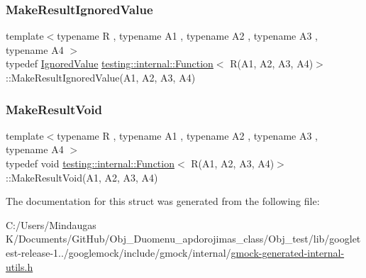 \mbox{\label{structtesting_1_1internal_1_1_function_3_01_r_07_a1_00_01_a2_00_01_a3_00_01_a4_08_4_a6736086d1c8ba25788add1e5180207f9}} 
\subsubsection{\texorpdfstring{MakeResultIgnoredValue}{MakeResultIgnoredValue}}
{\footnotesize\ttfamily template$<$typename R , typename A1 , typename A2 , typename A3 , typename A4 $>$ \\
typedef \mbox{\hyperlink{classtesting_1_1internal_1_1_ignored_value}{Ignored\+Value}} \mbox{\hyperlink{structtesting_1_1internal_1_1_function}{testing\+::internal\+::\+Function}}$<$ R(A1, A2, A3, A4)$>$\+::Make\+Result\+Ignored\+Value(A1, A2, A3, A4)}

\mbox{\label{structtesting_1_1internal_1_1_function_3_01_r_07_a1_00_01_a2_00_01_a3_00_01_a4_08_4_af7462da27e87a9d580e7f9748ebc5754}} 
\subsubsection{\texorpdfstring{MakeResultVoid}{MakeResultVoid}}
{\footnotesize\ttfamily template$<$typename R , typename A1 , typename A2 , typename A3 , typename A4 $>$ \\
typedef void \mbox{\hyperlink{structtesting_1_1internal_1_1_function}{testing\+::internal\+::\+Function}}$<$ R(A1, A2, A3, A4)$>$\+::Make\+Result\+Void(A1, A2, A3, A4)}



The documentation for this struct was generated from the following file\+:\begin{DoxyCompactItemize}
\item 
C\+:/\+Users/\+Mindaugas K/\+Documents/\+Git\+Hub/\+Obj\+\_\+\+Duomenu\+\_\+apdorojimas\+\_\+class/\+Obj\+\_\+test/lib/googletest-\/release-\/1../googlemock/include/gmock/internal/\mbox{\hyperlink{gmock-generated-internal-utils_8h}{gmock-\/generated-\/internal-\/utils.\+h}}\end{DoxyCompactItemize}
